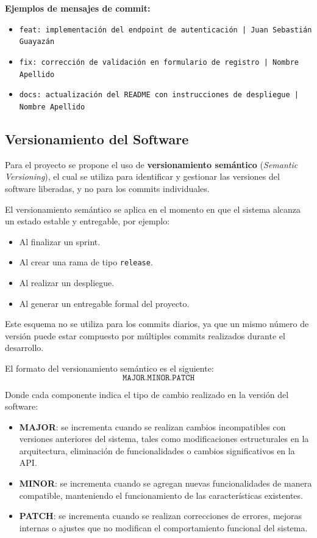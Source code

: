 \documentclass[12pt]{article}
\begin{document}
\textbf{Ejemplos de mensajes de commit:}
\begin{itemize}
    \item \texttt{feat: implementación del endpoint de autenticación | Juan Sebastián Guayazán}
    \item \texttt{fix: corrección de validación en formulario de registro | Nombre Apellido}
    \item \texttt{docs: actualización del README con instrucciones de despliegue | Nombre Apellido}
\end{itemize}

\subsection{Versionamiento del Software}

Para el proyecto se propone el uso de \textbf{versionamiento semántico} (\textit{Semantic Versioning}), el cual se utiliza para identificar y gestionar las versiones del software liberadas, y no para los commits individuales.

El versionamiento semántico se aplica en el momento en que el sistema alcanza un estado estable y entregable, por ejemplo:
\begin{itemize}
    \item Al finalizar un sprint.
    \item Al crear una rama de tipo \texttt{release}.
    \item Al realizar un despliegue.
    \item Al generar un entregable formal del proyecto.
\end{itemize}

Este esquema no se utiliza para los commits diarios, ya que un mismo número de versión puede estar compuesto por múltiples commits realizados durante el desarrollo.

El formato del versionamiento semántico es el siguiente:
\[
\texttt{MAJOR.MINOR.PATCH}
\]

Donde cada componente indica el tipo de cambio realizado en la versión del software:

\begin{itemize}
    \item \textbf{MAJOR}: se incrementa cuando se realizan cambios incompatibles con versiones anteriores del sistema, tales como modificaciones estructurales en la arquitectura, eliminación de funcionalidades o cambios significativos en la API.
    \item \textbf{MINOR}: se incrementa cuando se agregan nuevas funcionalidades de manera compatible, manteniendo el funcionamiento de las características existentes.
    \item \textbf{PATCH}: se incrementa cuando se realizan correcciones de errores, mejoras internas o ajustes que no modifican el comportamiento funcional del sistema.
\end{itemize}
\end{document}

